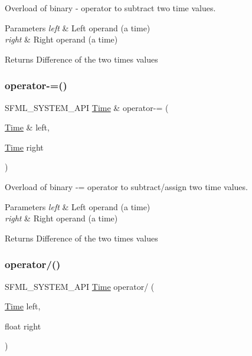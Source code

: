 Overload of binary -\/ operator to subtract two time values. 


\begin{DoxyParams}{Parameters}
{\em left} & Left operand (a time) \\
\hline
{\em right} & Right operand (a time)\\
\hline
\end{DoxyParams}
\begin{DoxyReturn}{Returns}
Difference of the two times values 
\end{DoxyReturn}
\mbox{\label{classsf_1_1_time_aaf7888302cf4847f97cfc26875367b94}} 
\subsubsection{\texorpdfstring{operator-\/=()}{operator-=()}}
{\footnotesize\ttfamily S\+F\+M\+L\+\_\+\+S\+Y\+S\+T\+E\+M\+\_\+\+A\+PI \hyperlink{classsf_1_1_time}{Time} \& operator-\/= (\begin{DoxyParamCaption}\item[{\hyperlink{classsf_1_1_time}{Time} \&}]{left,  }\item[{\hyperlink{classsf_1_1_time}{Time}}]{right }\end{DoxyParamCaption})\hspace{0.3cm}{\ttfamily [related]}}



Overload of binary -\/= operator to subtract/assign two time values. 


\begin{DoxyParams}{Parameters}
{\em left} & Left operand (a time) \\
\hline
{\em right} & Right operand (a time)\\
\hline
\end{DoxyParams}
\begin{DoxyReturn}{Returns}
Difference of the two times values 
\end{DoxyReturn}
\mbox{\label{classsf_1_1_time_a3386c392dbc62e51dfa59730854d1ed2}} 
\subsubsection{\texorpdfstring{operator/()}{operator/()}\hspace{0.1cm}{\footnotesize\ttfamily [1/3]}}
{\footnotesize\ttfamily S\+F\+M\+L\+\_\+\+S\+Y\+S\+T\+E\+M\+\_\+\+A\+PI \hyperlink{classsf_1_1_time}{Time} operator/ (\begin{DoxyParamCaption}\item[{\hyperlink{classsf_1_1_time}{Time}}]{left,  }\item[{float}]{right }\end{DoxyParamCaption})\hspace{0.3cm}{\ttfamily [related]}}



